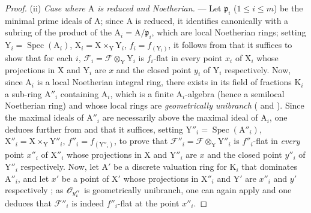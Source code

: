 \begin{proof}
(ii) \emph{Case where $\mathrm{A}$ is reduced and Noetherian.} --- Let $\mathfrak{p}_i$ ($1\leq i\leq m$) be the minimal prime ideals of $\mathrm{A}$; since $\mathrm{A}$ is reduced, it identifies canonically with a subring of the product of the $\mathrm{A}_i=\mathrm{A}/\mathfrak{p}_i$, which are local Noetherian rings; setting $\mathrm{Y}_i=\operatorname{Spec}(\mathrm{A}_i)$, $\mathrm{X}_i=\mathrm{X}\times_\mathrm{Y}\mathrm{Y}_i$, $f_i=f_{(\mathrm{Y}_i)}$, it follows from  that it suffices to show that for each $i$, $\mathscr{F}_i=\mathscr{F}\otimes_\mathrm{Y}\mathrm{Y}_i$ is $f_i$-flat in every point $x_i$ of $\mathrm{X}_i$ whose projections in $\mathrm{X}$ and $\mathrm{Y}_i$ are $x$ and the closed point $y_i$ of $\mathrm{Y}_i$ respectively.
Now, since $\mathrm{A}_i$ is a local Noetherian integral ring, there exists in its field of fractions $\mathrm{K}_i$ a sub-ring $\mathrm{A}''_i$ containing $\mathrm{A}_i$, which is a finite $\mathrm{A}_i$-algebra (hence a semilocal Noetherian ring) and whose local rings are \emph{geometrically unibranch} ( and ).
Since the maximal ideals of $\mathrm{A}''_i$ are necessarily above the maximal ideal of $\mathrm{A}_i$, one deduces further from  and  that it suffices, setting $\mathrm{Y}''_i=\operatorname{Spec}(\mathrm{A}''_i)$, $\mathrm{X}''_i=\mathrm{X}\times_\mathrm{Y}\mathrm{Y}''_i$, $f''_i=f_{(\mathrm{Y}''_i)}$, to prove that $\mathscr{F}''_i=\mathscr{F}\otimes_\mathrm{Y}\mathrm{Y}''_i$ is $f''_i$-flat in \emph{every} point $x''_i$ of $\mathrm{X}''_i$ whose projections in $\mathrm{X}$ and $\mathrm{Y}''_i$ are $x$ and the closed point $y''_i$ of $\mathrm{Y}''_i$ respectively.
Now, let $\mathrm{A}'$ be a discrete valuation ring for $\mathrm{K}_i$ that dominates $\mathrm{A}''_i$, and let $x'$ be a point of $\mathrm{X}'$ whose projections in $\mathrm{X}''_i$ and $\mathrm{Y}'$ are $x''_i$ and $y'$ respectively ; as $\mathscr{O}_{y''_i}$ is geometrically unibranch, one can again apply  and one deduces that $\mathscr{F}''_i$ is indeed $f''_i$-flat at the point $x''_i$.
\end{proof}


